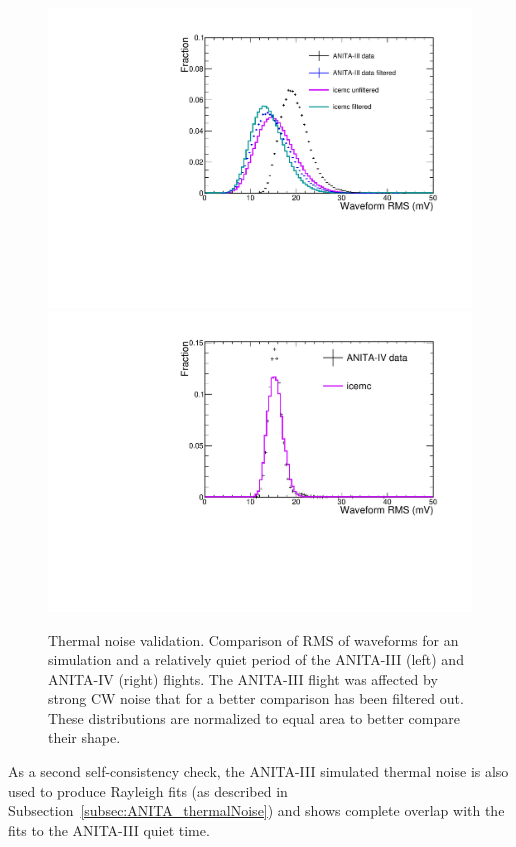 \begin{figure}[!h]\centering
  \includegraphics[width=.45\linewidth]{./Figs/ValidationThermalNoiseA3_RMSwaveform.pdf}
  \includegraphics[width=.45\linewidth]{./Figs/ValidationThermalNoiseA4_RMSwaveform.pdf}

\caption{Thermal noise validation. Comparison of RMS of waveforms for an \icemc simulation and a relatively quiet period of the ANITA-III (left) and ANITA-IV (right) flights.
    The ANITA-III flight was affected by strong CW noise that for a better comparison has been filtered out.
    These distributions are normalized to equal area to better compare their shape.
  }
  \label{fig:RMSwaveform}
\end{figure}

As a second self-consistency check, the ANITA-III simulated thermal
noise is also used to produce Rayleigh fits (as described in
Subsection~\ref{subsec:ANITA_thermalNoise}) and shows complete overlap with the fits to the
ANITA-III quiet time.



